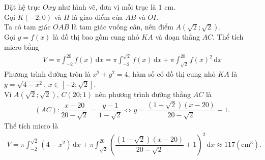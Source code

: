 \begin{bt}
{\begin{center}
		\end{center}
		Đặt hệ trục $Oxy$ như hình vẽ, đơn vị mỗi trục là  $1$ cm.\\
		Gọi  $K(-2;0)$ và $H$ là giao điểm của $AB$ và $OI$.\\
		Ta có tam  giác $OAB$ là tam giác vuông cân, nên điểm $A(\sqrt{2};\sqrt{2})$.\\
		Gọi $y=f(x)$ là đồ thị bao gồm cung nhỏ $KA$ và  đoạn thẳng $AC$. Thể tích micro bằng
		\begin{eqnarray*}
			V=\displaystyle  \pi\int_{-2}^{20}{f(x)\mathrm{\,d}x}=\pi\int_{-2}^{\sqrt{2}}{f(x)\mathrm{\,d}x}+\pi\int_{\sqrt{2}}^{20}{f(x)}^2\mathrm{\,d}x
		\end{eqnarray*}
		Phương trình đường tròn là $x^2+y^2=4$, hàm số có đồ thị cung nhỏ $KA$  là $y=\sqrt{4-x^2}$, $x \in [-2;\sqrt{2}]$.\\
		Vì $A\left(\sqrt{2};\sqrt{2}\right)$, $C(20;1)$  nên phương trình đường thẳng $AC$ là
		\begin{eqnarray*}	\left(AC\right)\colon\dfrac{x-20}{20-\sqrt{2}}=\dfrac{y-1}{1-\sqrt{2}}\Leftrightarrow y=\dfrac{\left(1-\sqrt{2}\right)\left(x-20\right)}{20-\sqrt{2}}+1.
		\end{eqnarray*}
		Thể tích  micro là
		\begin{eqnarray*}
			 V=\displaystyle\pi\int_{-2}^{\sqrt{2}}{\left(4-x^2\right)\mathrm{\,d}x}+\pi\int_{\sqrt{2}}^{20}{{\left(\dfrac{\left(1-\sqrt{2}\right)\left(x-20\right)}{20-\sqrt{2}}+1\right)}^2\mathrm{\,d}x}\approx 117\left(\text{cm}^3\right).
	\end{eqnarray*}}
\end{bt}

